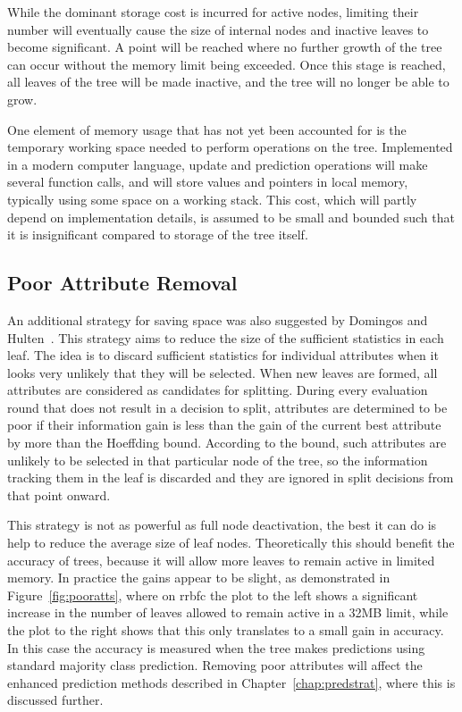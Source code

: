 While the dominant storage cost is incurred for active nodes, limiting their number will eventually cause the size of internal nodes and inactive leaves to become significant. A point will be reached where no further growth of the tree can occur without the memory limit being exceeded. Once this stage is reached, all leaves of the tree will be made inactive, and the tree will no longer be able to grow.

One element of memory usage that has not yet been accounted for is the temporary working space needed to perform operations on the tree. Implemented in a modern computer language, update and prediction operations will make several function calls, and will store values and pointers in local memory, typically using some space on a working stack. This cost, which will partly depend on implementation details, is assumed to be small and bounded such that it is insignificant compared to storage of the tree itself.

\subsection{Poor Attribute Removal}
\label{sec:pooratts}

An additional strategy for saving space was also suggested by Domingos and Hulten~\cite{vfdt}. This strategy aims to reduce the size of the sufficient statistics in each leaf. 
The idea is to discard sufficient statistics for individual attributes when it looks very unlikely that they will be selected.
When new leaves are formed, all attributes are considered as candidates for splitting. During every evaluation round that does not result in a decision to split, attributes are determined to be poor if their information gain is less than the gain of the current best attribute by more than the Hoeffding bound. According to the bound, such attributes are unlikely to be selected in that particular node of the tree, so the information tracking them in the leaf is discarded and they are ignored in split decisions from that point onward.

This strategy is not as powerful as full node deactivation, the best it can do is help to reduce the average size of leaf nodes. Theoretically this should benefit the accuracy of trees, because it will allow more leaves to remain active in limited memory. In practice the gains appear to be slight, as demonstrated in Figure~\ref{fig:pooratts}, where on {\sc rrbfc} the plot to the left shows a significant increase in the number of leaves allowed to remain active in a 32MB limit, while the plot to the right shows that this only translates to a small gain in accuracy. In this case the accuracy is measured when the tree makes predictions using standard majority class prediction. Removing poor attributes will affect the enhanced prediction methods described in Chapter~\ref{chap:predstrat}, where this is discussed further.

